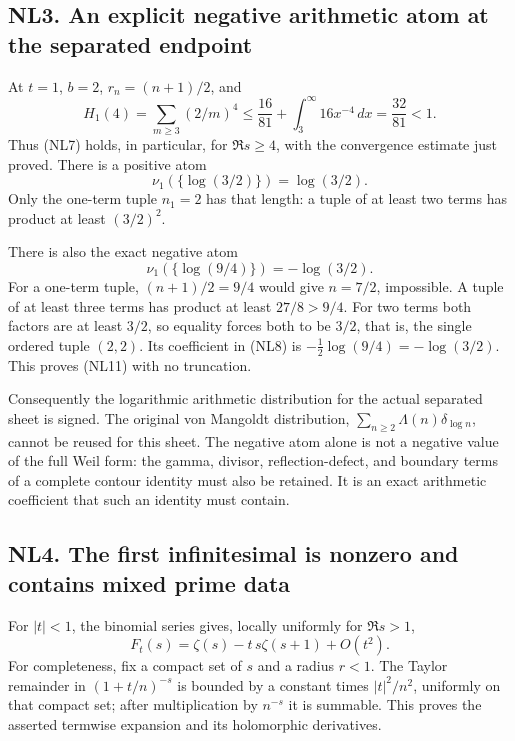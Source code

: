 \documentclass[
  10pt,
  a4paper,
]{article}
\begin{document}
\subsection{NL3. An explicit negative arithmetic atom at the separated
endpoint}\label{nl3.-an-explicit-negative-arithmetic-atom-at-the-separated-endpoint}

At \(t=1\), \(b=2\), \(r_n=(n+1)/2\), and \[
H_1(4)=\sum_{m\ge3}(2/m)^4
\le\frac{16}{81}+\int_3^\infty16x^{-4}\,dx
=\frac{32}{81}<1.
\tag{NL9}
\] Thus (NL7) holds, in particular, for \(\Re s\ge4\), with the
convergence estimate just proved. There is a positive atom \[
\nu_1(\{\log(3/2)\})=\log(3/2).
\tag{NL10}
\] Only the one-term tuple \(n_1=2\) has that length: a tuple of at
least two terms has product at least \((3/2)^2\).

There is also the exact negative atom \[
\boxed{\nu_1(\{\log(9/4)\})=-\log(3/2).}
\tag{NL11}
\] For a one-term tuple, \((n+1)/2=9/4\) would give \(n=7/2\),
impossible. A tuple of at least three terms has product at least
\(27/8>9/4\). For two terms both factors are at least \(3/2\), so
equality forces both to be \(3/2\), that is, the single ordered tuple
\((2,2)\). Its coefficient in (NL8) is
\(-\tfrac12\log(9/4)=-\log(3/2)\). This proves (NL11) with no
truncation.

Consequently the logarithmic arithmetic distribution for the actual
separated sheet is signed. The original von Mangoldt distribution,
\(\sum_{n\ge2}\Lambda(n)\delta_{\log n}\), cannot be reused for this
sheet. The negative atom alone is not a negative value of the full Weil
form: the gamma, divisor, reflection-defect, and boundary terms of a
complete contour identity must also be retained. It is an exact
arithmetic coefficient that such an identity must contain.

\subsection{NL4. The first infinitesimal is nonzero and contains mixed
prime
data}\label{nl4.-the-first-infinitesimal-is-nonzero-and-contains-mixed-prime-data}

For \(|t|<1\), the binomial series gives, locally uniformly for
\(\Re s>1\), \[
F_t(s)=\zeta(s)-t\,s\zeta(s+1)+O(t^2).
\tag{NL12}
\] For completeness, fix a compact set of \(s\) and a radius \(r<1\).
The Taylor remainder in \((1+t/n)^{-s}\) is bounded by a constant times
\(|t|^2/n^2\), uniformly on that compact set; after multiplication by
\(n^{-s}\) it is summable. This proves the asserted termwise expansion
and its holomorphic derivatives.
\end{document}

